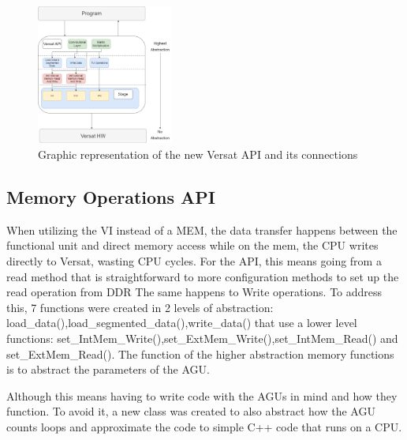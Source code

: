 \documentclass[conference]{IEEEtran}
\begin{document}
\begin{figure}[!htbp]
    \centering
    \includegraphics[width=0.4\textwidth]{Figures/VersatMemory.drawio.png}
    \caption{Graphic representation of the new Versat API and its connections}
    \label{newAPI}
\end{figure} 


\subsection{Memory Operations API}

When utilizing the VI instead of a MEM, the data transfer happens between the functional unit and direct memory access while
on the mem, the CPU writes directly to Versat, wasting CPU cycles. For the API, this means going from a read method that is straightforward
to more configuration methods to set up the read operation from DDR The same happens to Write operations. To address this, 7 functions were created in 2 levels of abstraction:
load\_data(),load\_segmented\_data(),write\_data() that use a lower level functions: set\_IntMem\_Write(),set\_ExtMem\_Write(),set\_IntMem\_Read() and set\_ExtMem\_Read().
The function of the higher abstraction memory functions is to abstract the parameters of the AGU. 

% 


Although this means having to write code with the AGUs in mind
and how they function. To avoid it, a new class was created to also abstract how the AGU counts loops and approximate 
the code to simple C++ code that runs on a CPU.

% 
\end{document}
